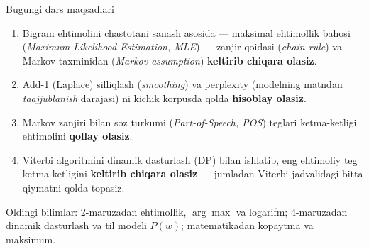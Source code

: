 \documentclass[aspectratio=169,11pt]{beamer}
\newcommand{\uzq}{\textquotesingle{}}
\begin{document}
\begin{frame}{Bugungi dars maqsadlari}
\small

\begin{enumerate}\setlength\itemsep{5pt}
  \item Bigram ehtimolini chastotani sanash asosida
        --- maksimal ehtimollik bahosi (\textit{Maximum Likelihood Estimation, MLE})
        --- zanjir qoidasi (\textit{chain rule}) va Markov taxminidan
        (\textit{Markov assumption}) \textbf{keltirib chiqara olasiz}.

  \item Add-1 (Laplace) silliqlash (\textit{smoothing}) va perplexity (modelning
        matndan \textit{taajjublanish} darajasi) ni kichik korpusda qo\uzq{}lda
        \textbf{hisoblay olasiz}.

  \item Markov zanjiri bilan so\uzq{}z turkumi
        (\textit{Part-of-Speech, POS}) teglari ketma-ketligi ehtimolini
        \textbf{qo\uzq{}llay olasiz}.

  \item Viterbi algoritmini dinamik dasturlash (DP) bilan ishlatib, eng ehtimoliy
        teg ketma-ketligini \textbf{keltirib chiqara olasiz} --- jumladan
        Viterbi jadvalidagi bitta qiymatni qo\uzq{}lda topasiz.
\end{enumerate}

\vspace{4pt}

\begin{tcolorbox}[defbox]
\footnotesize
Oldingi bilimlar: 2-ma\uzq{}ruzadan ehtimollik, $\arg\max$ va logarifm;
4-ma\uzq{}ruzadan dinamik dasturlash va til modeli $P(w)$;
matematikadan ko\uzq{}paytma va maksimum.
\end{tcolorbox}

\end{frame}
\end{document}
